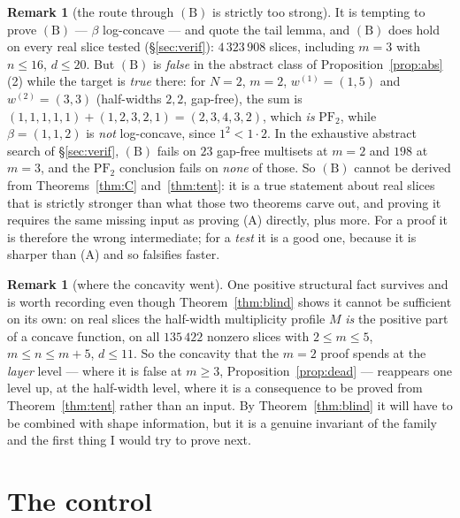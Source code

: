 \documentclass[11pt]{article}
\theoremstyle{definition}
\newtheorem{remark}[theorem]{Remark}
\newcommand{\PFtwo}{\mathrm{PF}_2}
\begin{document}
\begin{remark}[the route through $(\mathrm B)$ is strictly too strong]\label{rem:toostrong}
It is tempting to prove $(\mathrm B)$ --- $\beta$ log-concave --- and quote the tail lemma,
and $(\mathrm B)$ does hold on every real slice tested (§\ref{sec:verif}): $4\,323\,908$
slices, including $m=3$ with $n\le16$, $d\le20$. But $(\mathrm B)$ is \emph{false} in the
abstract class of Proposition~\ref{prop:abs}(2) while the target is \emph{true} there: for
$N=2$, $m=2$, $w^{(1)}=(1,5)$ and $w^{(2)}=(3,3)$ (half-widths $2,2$, gap-free), the sum is
$(1,1,1,1,1)+(1,2,3,2,1)=(2,3,4,3,2)$, which \emph{is} $\PFtwo$, while $\beta=(1,1,2)$ is
\emph{not} log-concave, since $1^2<1\cdot2$. In the exhaustive abstract search of
§\ref{sec:verif}, $(\mathrm B)$ fails on $23$ gap-free multisets at $m=2$ and $198$ at
$m=3$, and the $\PFtwo$ conclusion fails on \emph{none} of those. So $(\mathrm B)$ cannot be
derived from Theorems~\ref{thm:C} and~\ref{thm:tent}: it is a true statement about real
slices that is strictly stronger than what those two theorems carve out, and proving it
requires the same missing input as proving (A) directly, plus more. For a proof it is
therefore the wrong intermediate; for a \emph{test} it is a good one, because it is sharper
than (A) and so falsifies faster.
\end{remark}

\begin{remark}[where the concavity went]\label{rem:Mconcave}
One positive structural fact survives and is worth recording even though
Theorem~\ref{thm:blind} shows it cannot be sufficient on its own: on real slices the
half-width multiplicity profile $M$ \emph{is} the positive part of a concave function, on all
$135\,422$ nonzero slices with $2\le m\le5$, $m\le n\le m+5$, $d\le11$. So the concavity that
the $m=2$ proof spends at the \emph{layer} level --- where it is false at $m\ge3$,
Proposition~\ref{prop:dead} --- reappears one level up, at the half-width level, where it is
a consequence to be proved from Theorem~\ref{thm:tent} rather than an input. By
Theorem~\ref{thm:blind} it will have to be combined with shape information, but it is a
genuine invariant of the family and the first thing I would try to prove next.
\end{remark}

\section{The control}\label{sec:control}
\end{document}
